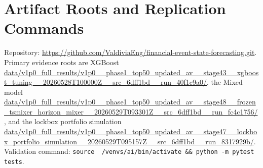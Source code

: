 \documentclass[sigconf,nonacm]{acmart}
\begin{document}
\clearpage




\clearpage
\onecolumn

\appendix

\section{Artifact Roots and Replication Commands}
\begingroup\scriptsize\sloppy
Repository: \url{https://github.com/ValdiviaEng/financial-event-state-forecasting.git}. Primary evidence roots are XGBoost \url{data/v1p0_full_results/v1p0__phase1_top50_updated_av__stage43__xgboost_tuning__20260528T100000Z__src_6dff1bd__run_40f1c9a0/}, the Mixed model \url{data/v1p0_full_results/v1p0__phase1_top50_updated_av__stage48__frozen_tsmixer_horizon_mixer__20260529T093301Z__src_6dff1bd__run_fc4c1756/}, and the lockbox portfolio simulation \url{data/v1p0_full_results/v1p0__phase1_top50_updated_av__stage47__lockbox_portfolio_simulation__20260529T095157Z__src_6dff1bd__run_8317929b/}. Validation command: \texttt{source \string~/venvs/ai/bin/activate \&\& python -m pytest tests}.
\endgroup
\end{document}
